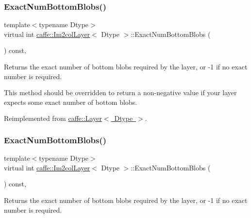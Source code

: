\subsubsection{\texorpdfstring{Exact\+Num\+Bottom\+Blobs()}{ExactNumBottomBlobs()}\hspace{0.1cm}{\footnotesize\ttfamily [1/2]}}
{\footnotesize\ttfamily template$<$typename Dtype$>$ \\
virtual int \mbox{\hyperlink{classcaffe_1_1_im2col_layer}{caffe\+::\+Im2col\+Layer}}$<$ Dtype $>$\+::Exact\+Num\+Bottom\+Blobs (\begin{DoxyParamCaption}{ }\end{DoxyParamCaption}) const\hspace{0.3cm}{\ttfamily [inline]}, {\ttfamily [virtual]}}



Returns the exact number of bottom blobs required by the layer, or -\/1 if no exact number is required. 

This method should be overridden to return a non-\/negative value if your layer expects some exact number of bottom blobs. 

Reimplemented from \mbox{\hyperlink{classcaffe_1_1_layer_a8e5ee0494d85f5f55fc4396537cbc60f}{caffe\+::\+Layer$<$ Dtype $>$}}.

\mbox{\label{classcaffe_1_1_im2col_layer_a35772d667af49afe707c7b1db881c573}} 
\subsubsection{\texorpdfstring{Exact\+Num\+Bottom\+Blobs()}{ExactNumBottomBlobs()}\hspace{0.1cm}{\footnotesize\ttfamily [2/2]}}
{\footnotesize\ttfamily template$<$typename Dtype$>$ \\
virtual int \mbox{\hyperlink{classcaffe_1_1_im2col_layer}{caffe\+::\+Im2col\+Layer}}$<$ Dtype $>$\+::Exact\+Num\+Bottom\+Blobs (\begin{DoxyParamCaption}{ }\end{DoxyParamCaption}) const\hspace{0.3cm}{\ttfamily [inline]}, {\ttfamily [virtual]}}



Returns the exact number of bottom blobs required by the layer, or -\/1 if no exact number is required. 

